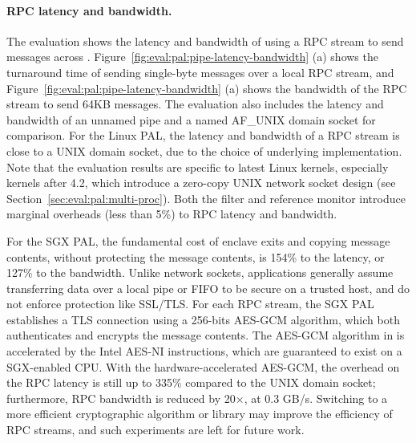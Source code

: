 \paragraph{RPC latency and bandwidth.}
The evaluation shows the latency and bandwidth of using a RPC stream to send messages across \picoprocs{}.
Figure~\ref{fig:eval:pal:pipe-latency-bandwidth} (a) shows
the turnaround time of sending single-byte messages over a local RPC stream, and Figure~\ref{fig:eval:pal:pipe-latency-bandwidth} (a) shows the bandwidth of the RPC stream to send
64KB messages.
The evaluation also includes the latency and bandwidth of an unnamed pipe and a named AF\_UNIX domain socket
for comparison.
For the Linux PAL, the latency and bandwidth of a RPC stream is
close to a UNIX domain socket, due to the choice of underlying implementation.
Note that the evaluation results are specific to latest Linux kernels, especially kernels after 4.2,
which introduce a zero-copy UNIX network socket design (see Section~\ref{sec:eval:pal:multi-proc}). 
Both the \seccomp{} filter and reference monitor introduce marginal overheads (less than 5\%) to RPC latency and bandwidth.


For the SGX PAL,
the fundamental cost of enclave exits and copying message contents,
without protecting the message contents,
is \roughly{}154\% to the latency,
or \roughly{}127\% to the bandwidth.
Unlike network sockets, 
applications generally assume transferring data over a local pipe or FIFO to be secure on a trusted host, and do not enforce protection like SSL/TLS.
For each RPC stream, the SGX PAL establishes a TLS connection using a 256-bits AES-GCM algorithm, which both authenticates and encrypts the message contents.
The AES-GCM algorithm in \graphenesgx{} is accelerated by the Intel AES-NI instructions, which are guaranteed to exist on a SGX-enabled CPU.
With the hardware-accelerated AES-GCM,
the overhead on the RPC latency is still up to \roughly{}335\% compared to the UNIX domain socket;
furthermore, RPC bandwidth
is reduced by \roughly{}20$\times$, at \roughly{}0.3 GB/s.
Switching to a more efficient cryptographic algorithm or library may improve the efficiency of RPC streams,
and such experiments are left for future work.



